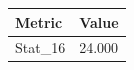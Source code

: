 \begin{tabular}{ll}
\toprule
Metric & Value \\
\midrule
Stat\_16 & 24.000 \\
\bottomrule
\end{tabular}